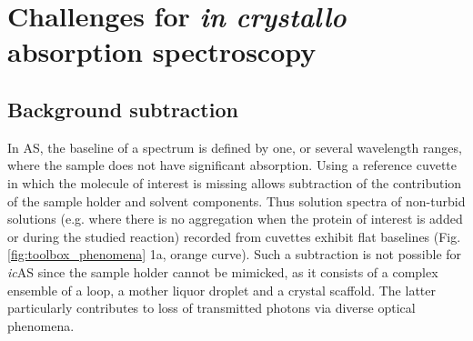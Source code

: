 \section{Challenges for \textit{in crystallo} absorption spectroscopy}
\subsection{Background subtraction}

In AS, the baseline of a spectrum is defined by one, or several wavelength ranges, where the sample does not have significant absorption. Using a reference cuvette in which the molecule of interest is missing allows subtraction of the contribution of the sample holder and solvent components. Thus solution spectra of non-turbid solutions (e.g. where there is no aggregation when the protein of interest is added or during the studied reaction) recorded from cuvettes exhibit flat baselines (Fig. \ref{fig:toolbox_phenomena} 1a, orange curve). Such a subtraction is not possible for \textit{ic}AS since the sample holder cannot be mimicked, as it consists of a complex ensemble of a loop, a mother liquor droplet and a crystal scaffold. The latter particularly contributes to loss of transmitted photons via diverse optical phenomena. 


